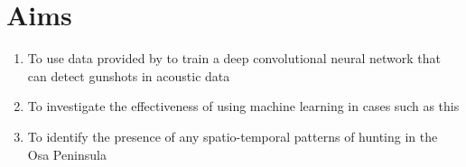 \section{Aims}

\begin{enumerate}
  \item To use data provided by \cite{Hill2018} to train a deep convolutional neural network that can detect gunshots in acoustic data
  \item To investigate the effectiveness of using machine learning in cases such as this
  \item To identify the presence of any spatio-temporal patterns of hunting in the Osa Peninsula
\end{enumerate}
